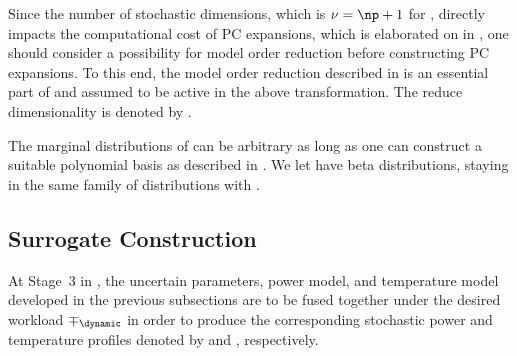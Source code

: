 Since the number of stochastic dimensions, which is $\nu = \np + 1$ for \vu,
directly impacts the computational cost of \ac{PC} expansions, which is
elaborated on in , one should consider a possibility
for model order reduction before constructing \ac{PC} expansions. To this end,
the model order reduction described in  is an
essential part of and assumed to be active in the above transformation. The
reduce dimensionality is denoted by \nz.

The marginal distributions of \vz can be arbitrary as long as one can construct
a suitable polynomial basis as described in . We let
\vz have beta distributions, staying in the same family of distributions with
\vu.

\subsection{Surrogate Construction}

At Stage~3 in , the uncertain parameters, power model, and
temperature model developed in the previous subsections are to be fused together
under the desired workload $\mp_\dynamic$ in order to produce the corresponding
stochastic power and temperature profiles denoted by \mp and \mq, respectively.

